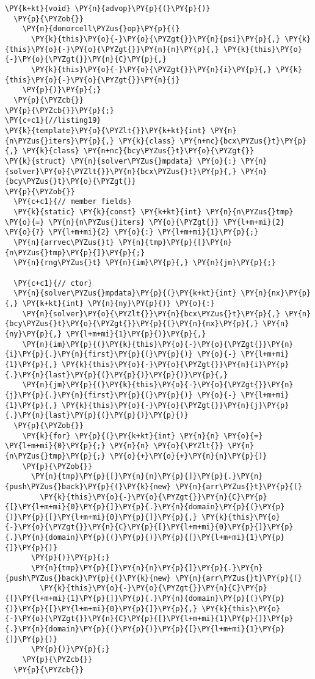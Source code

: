 \begin{Verbatim}[commandchars=\\\{\}]
  \PY{k+kt}{void} \PY{n}{advop}\PY{p}{(}\PY{p}{)}
  \PY{p}{\PYZob{}}
    \PY{n}{donorcell\PYZus{}op}\PY{p}{(}
      \PY{k}{this}\PY{o}{-}\PY{o}{\PYZgt{}}\PY{n}{psi}\PY{p}{,} \PY{k}{this}\PY{o}{-}\PY{o}{\PYZgt{}}\PY{n}{n}\PY{p}{,} \PY{k}{this}\PY{o}{-}\PY{o}{\PYZgt{}}\PY{n}{C}\PY{p}{,} 
      \PY{k}{this}\PY{o}{-}\PY{o}{\PYZgt{}}\PY{n}{i}\PY{p}{,} \PY{k}{this}\PY{o}{-}\PY{o}{\PYZgt{}}\PY{n}{j}
    \PY{p}{)}\PY{p}{;}
  \PY{p}{\PYZcb{}}
\PY{p}{\PYZcb{}}\PY{p}{;}
\PY{c+c1}{//listing19}
\PY{k}{template}\PY{o}{\PYZlt{}}\PY{k+kt}{int} \PY{n}{n\PYZus{}iters}\PY{p}{,} \PY{k}{class} \PY{n+nc}{bcx\PYZus{}t}\PY{p}{,} \PY{k}{class} \PY{n+nc}{bcy\PYZus{}t}\PY{o}{\PYZgt{}}
\PY{k}{struct} \PY{n}{solver\PYZus{}mpdata} \PY{o}{:} \PY{n}{solver}\PY{o}{\PYZlt{}}\PY{n}{bcx\PYZus{}t}\PY{p}{,} \PY{n}{bcy\PYZus{}t}\PY{o}{\PYZgt{}}
\PY{p}{\PYZob{}}
  \PY{c+c1}{// member fields}
  \PY{k}{static} \PY{k}{const} \PY{k+kt}{int} \PY{n}{n\PYZus{}tmp} \PY{o}{=} \PY{n}{n\PYZus{}iters} \PY{o}{\PYZgt{}} \PY{l+m+mi}{2} \PY{o}{?} \PY{l+m+mi}{2} \PY{o}{:} \PY{l+m+mi}{1}\PY{p}{;}
  \PY{n}{arrvec\PYZus{}t} \PY{n}{tmp}\PY{p}{[}\PY{n}{n\PYZus{}tmp}\PY{p}{]}\PY{p}{;}
  \PY{n}{rng\PYZus{}t} \PY{n}{im}\PY{p}{,} \PY{n}{jm}\PY{p}{;}

  \PY{c+c1}{// ctor}
  \PY{n}{solver\PYZus{}mpdata}\PY{p}{(}\PY{k+kt}{int} \PY{n}{nx}\PY{p}{,} \PY{k+kt}{int} \PY{n}{ny}\PY{p}{)} \PY{o}{:} 
    \PY{n}{solver}\PY{o}{\PYZlt{}}\PY{n}{bcx\PYZus{}t}\PY{p}{,} \PY{n}{bcy\PYZus{}t}\PY{o}{\PYZgt{}}\PY{p}{(}\PY{n}{nx}\PY{p}{,} \PY{n}{ny}\PY{p}{,} \PY{l+m+mi}{1}\PY{p}{)}\PY{p}{,} 
    \PY{n}{im}\PY{p}{(}\PY{k}{this}\PY{o}{-}\PY{o}{\PYZgt{}}\PY{n}{i}\PY{p}{.}\PY{n}{first}\PY{p}{(}\PY{p}{)} \PY{o}{-} \PY{l+m+mi}{1}\PY{p}{,} \PY{k}{this}\PY{o}{-}\PY{o}{\PYZgt{}}\PY{n}{i}\PY{p}{.}\PY{n}{last}\PY{p}{(}\PY{p}{)}\PY{p}{)}\PY{p}{,}
    \PY{n}{jm}\PY{p}{(}\PY{k}{this}\PY{o}{-}\PY{o}{\PYZgt{}}\PY{n}{j}\PY{p}{.}\PY{n}{first}\PY{p}{(}\PY{p}{)} \PY{o}{-} \PY{l+m+mi}{1}\PY{p}{,} \PY{k}{this}\PY{o}{-}\PY{o}{\PYZgt{}}\PY{n}{j}\PY{p}{.}\PY{n}{last}\PY{p}{(}\PY{p}{)}\PY{p}{)}
  \PY{p}{\PYZob{}}
    \PY{k}{for} \PY{p}{(}\PY{k+kt}{int} \PY{n}{n} \PY{o}{=} \PY{l+m+mi}{0}\PY{p}{;} \PY{n}{n} \PY{o}{\PYZlt{}} \PY{n}{n\PYZus{}tmp}\PY{p}{;} \PY{o}{+}\PY{o}{+}\PY{n}{n}\PY{p}{)}
    \PY{p}{\PYZob{}}
      \PY{n}{tmp}\PY{p}{[}\PY{n}{n}\PY{p}{]}\PY{p}{.}\PY{n}{push\PYZus{}back}\PY{p}{(}\PY{k}{new} \PY{n}{arr\PYZus{}t}\PY{p}{(}
        \PY{k}{this}\PY{o}{-}\PY{o}{\PYZgt{}}\PY{n}{C}\PY{p}{[}\PY{l+m+mi}{0}\PY{p}{]}\PY{p}{.}\PY{n}{domain}\PY{p}{(}\PY{p}{)}\PY{p}{[}\PY{l+m+mi}{0}\PY{p}{]}\PY{p}{,} \PY{k}{this}\PY{o}{-}\PY{o}{\PYZgt{}}\PY{n}{C}\PY{p}{[}\PY{l+m+mi}{0}\PY{p}{]}\PY{p}{.}\PY{n}{domain}\PY{p}{(}\PY{p}{)}\PY{p}{[}\PY{l+m+mi}{1}\PY{p}{]}\PY{p}{)}
      \PY{p}{)}\PY{p}{;}
      \PY{n}{tmp}\PY{p}{[}\PY{n}{n}\PY{p}{]}\PY{p}{.}\PY{n}{push\PYZus{}back}\PY{p}{(}\PY{k}{new} \PY{n}{arr\PYZus{}t}\PY{p}{(}
        \PY{k}{this}\PY{o}{-}\PY{o}{\PYZgt{}}\PY{n}{C}\PY{p}{[}\PY{l+m+mi}{1}\PY{p}{]}\PY{p}{.}\PY{n}{domain}\PY{p}{(}\PY{p}{)}\PY{p}{[}\PY{l+m+mi}{0}\PY{p}{]}\PY{p}{,} \PY{k}{this}\PY{o}{-}\PY{o}{\PYZgt{}}\PY{n}{C}\PY{p}{[}\PY{l+m+mi}{1}\PY{p}{]}\PY{p}{.}\PY{n}{domain}\PY{p}{(}\PY{p}{)}\PY{p}{[}\PY{l+m+mi}{1}\PY{p}{]}\PY{p}{)}
      \PY{p}{)}\PY{p}{;}
    \PY{p}{\PYZcb{}}
  \PY{p}{\PYZcb{}}


\end{Verbatim}

